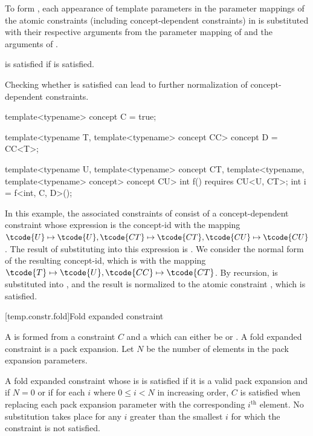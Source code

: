 \pnum
To form ,
each appearance of  template parameters in
the parameter mappings of the atomic constraints
(including concept-dependent constraints)
in 
is substituted with their respective arguments from
the parameter mapping of  and the arguments of .

\pnum
{} is satisfied if  is satisfied.
\begin{note}
Checking whether  is satisfied
can lead to further normalization of concept-dependent constraints.
\end{note}
\begin{example}
\begin{codeblock}
template<typename>
concept C = true;

template<typename T, template<typename> concept CC>
concept D = CC<T>;

template<typename U,
         template<typename> concept CT,
         template<typename, template<typename> concept> concept CU>
int f() requires CU<U, CT>;
int i = f<int, C, D>();
\end{codeblock}
In this example, the associated constraints of 
consist of a concept-dependent constraint
whose expression is the concept-id  with the mapping
$\tcode{U} \mapsto \tcode{U}, \tcode{CT} \mapsto \tcode{CT}, \tcode{CU} \mapsto \tcode{CU}$.
The result of substituting  into this expression is .
We consider the normal form of the resulting concept-id,
which is  with the mapping
$\tcode{T} \mapsto \tcode{U}, \tcode{CC} \mapsto \tcode{CT}$.
By recursion,  is substituted into , and the result
is normalized to the atomic constraint , which is satisfied.
\end{example}

[temp.constr.fold]{Fold expanded constraint}

\pnum
A  is formed from a constraint $C$ and
a 
which can either be \tcode{\&\&} or \tcode{||}.
A fold expanded constraint is a pack expansion.
Let $N$ be the number of elements
in the pack expansion parameters.

\pnum
A fold expanded constraint whose  is \tcode{\&\&}
is satisfied if it is a valid pack expansion and
if $N = 0$ or if for each $i$ where $0 \le i < N$ in increasing order,
$C$ is satisfied
when replacing each pack expansion parameter
with the corresponding $i^\text{th}$ element.
No substitution takes place for any $i$ greater than
the smallest $i$ for which the constraint is not satisfied.

